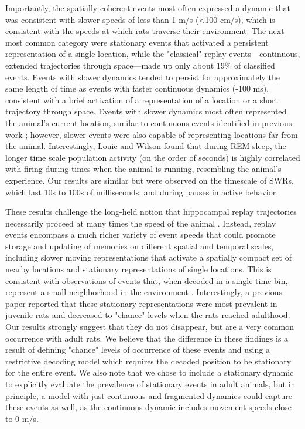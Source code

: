 \documentclass[9pt,lineno]{elife}
\begin{document}
Importantly, the spatially coherent events most often expressed a dynamic that was consistent with slower speeds of less than 1 m/s (<100 cm/s), which is consistent with the speeds at which rats traverse their environment. The next most common category were stationary events \citep{YuDistincthippocampalcorticalmemory2017, FarooqEmergencepreconfiguredplastic2019, MuessigCoordinatedEmergenceHippocampal2019} that activated a persistent representation of a single location, while the "classical" replay events---continuous, extended trajectories through space---made up only about 19\% of classified events. Events with slower dynamics tended to persist for approximately the same length of time as events  with faster continuous dynamics (-100 ms), consistent with a brief activation of a representation of a location or a short trajectory through space. Events with slower dynamics most often represented the animal's current location, similar to continuous events identified in previous work \citep{DavidsonHippocampalReplayExtended2009, KarlssonAwakereplayremote2009}; however, slower events were also capable of representing locations far from the animal. Interestingly, Louie and Wilson \citeyearpar{LouieTemporallyStructuredReplay2001} found that during REM sleep, the longer time scale population activity (on the order of seconds) is highly correlated with firing during times when the animal is running, resembling the animal's experience. Our results are similar but were observed on the timescale of SWRs, which last 10s to 100s of milliseconds, and during pauses in active behavior. 

These results challenge the long-held notion that hippocampal replay trajectories necessarily proceed at many times the speed of the animal \citep{NadasdyReplayTimeCompression1999, LeeMemorySequentialExperience2002, DavidsonHippocampalReplayExtended2009}. Instead, replay events encompass a much richer variety of event speeds that could promote storage and updating of memories on different spatial and temporal scales, including slower moving representations that activate a spatially compact set of nearby locations and stationary representations of single locations. This is consistent with observations of events that, when decoded in a single time bin, represent a small neighborhood in the environment \citep{Dupretreorganizationreactivationhippocampal2010}. Interestingly, a previous paper \citep{FarooqEmergencepreconfiguredplastic2019} reported that these stationary representations were most prevalent in juvenile rats and decreased to "chance" levels when the rats reached adulthood. Our results strongly suggest that they do not disappear, but are a very common occurrence with adult rats. We believe that the difference in these findings is a result of defining "chance" levels of occurrence of these events and using a restrictive decoding model which requires the decoded position to be stationary for the entire event. We also note that we chose to include a stationary dynamic to explicitly evaluate the prevalence of stationary events in adult animals, but in principle, a model with just continuous and fragmented dynamics could capture these events as well, as the continuous dynamic includes movement speeds close to 0 m/s.
\end{document}

